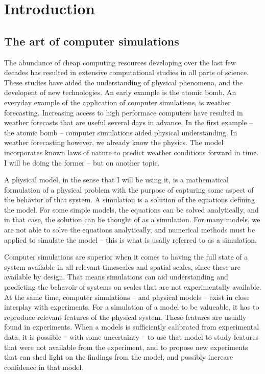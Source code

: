 \chapter{Introduction}
\section{The art of computer simulations}
The abundance of cheap computing resources developing over the last few decades has resulted in extensive computational studies in all parts of science. These studies have aided the understanding of physical phenomena, and the developent of new technologies. An early example is the atomic bomb. An everyday example of the application of computer simulations, is weather forecasting. Increasing access to high performace computers have resulted in weather forecasts that are useful several days in advance. In the first example -- the atomic bomb -- computer simulations aided physical understanding. In weather forecasting however, we already know the physics. The model incorporates known laws of nature to predict weather conditions forward in time. I will be doing the former -- but on another topic.

A physical model, in the sense that I will be using it, is a mathematical formulation of a physical problem with the purpose of capturing some aspect of the behavior of that system. A simulation is a solution of the equations defining the model. For some simple models, the equations can be solved analytically, and in that case, the solution can be thought of as a simulation. For many models, we are not able to solve the equations analytically, and numerical methods must be applied to simulate the model -- this is what is usally referred to as a simulation.

Computer simulations are superior when it comes to having the full state of a system available in all relevant timescales and spatial scales, since these are available by design. That means simulations can aid understanding and predicting the behavoir of systems on scales that are not experimentally available. At the same time, computer simulations -- and physical models -- exist in close interplay with experiments. For a simulation of a model to be valueable, it has to reproduce relevant features of the physical system. These features are usually found in experiments. When a models is sufficiently calibrated from experimental data, it is possible -- with some uncertainty -- to use that model to study features that were not available from the experiment, and to propose new experiments that can shed light on the findings from the model, and possibly increase confidence in that model.

